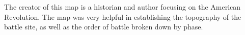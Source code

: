 The creator of this map is a historian and author focusing on the American
Revolution.  The map was very helpful in establishing the topography of the
battle site, as well as the order of battle broken down by phase.
